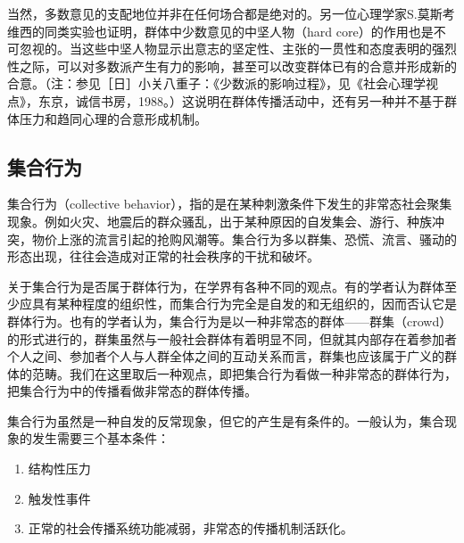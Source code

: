 \documentclass[UTF8,12pt]{ctexart}
\numberwithin{equation}{section} %
\numberwithin{figure}{section}
\numberwithin{table}{section}
\begin{document}
	当然，多数意见的支配地位并非在任何场合都是绝对的。另一位心理学家S.莫斯考维西的同类实验也证明，群体中少数意见的中坚人物（hard core）的作用也是不可忽视的。当这些中坚人物显示出意志的坚定性、主张的一贯性和态度表明的强烈性之际，可以对多数派产生有力的影响，甚至可以改变群体已有的合意并形成新的合意。（注：参见［日］小关八重子：《少数派的影响过程》，见《社会心理学视点》，东京，诚信书房，1988。）这说明在群体传播活动中，还有另一种并不基于群体压力和趋同心理的合意形成机制。
	
	\subsection{集合行为}
	集合行为（collective behavior），指的是在某种刺激条件下发生的非常态社会聚集现象。例如火灾、地震后的群众骚乱，出于某种原因的自发集会、游行、种族冲突，物价上涨的流言引起的抢购风潮等。集合行为多以群集、恐慌、流言、骚动的形态出现，往往会造成对正常的社会秩序的干扰和破坏。
	
	关于集合行为是否属于群体行为，在学界有各种不同的观点。有的学者认为群体至少应具有某种程度的组织性，而集合行为完全是自发的和无组织的，因而否认它是群体行为。也有的学者认为，集合行为是以一种非常态的群体——群集（crowd）的形式进行的，群集虽然与一般社会群体有着明显不同，但就其内部存在着参加者个人之间、参加者个人与人群全体之间的互动关系而言，群集也应该属于广义的群体的范畴。我们在这里取后一种观点，即把集合行为看做一种非常态的群体行为，把集合行为中的传播看做非常态的群体传播。
	
	集合行为虽然是一种自发的反常现象，但它的产生是有条件的。一般认为，集合现象的发生需要三个基本条件：
	\begin{enumerate}
		\item 结构性压力
		
		\item 触发性事件
		
		\item 正常的社会传播系统功能减弱，非常态的传播机制活跃化。
	\end{enumerate}
	
\end{document}
